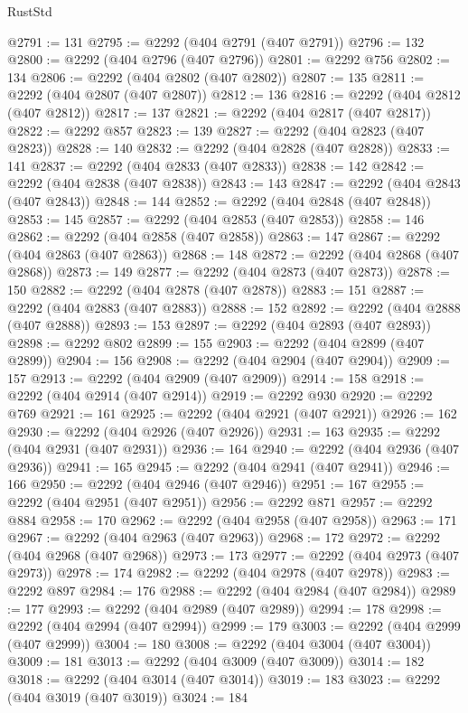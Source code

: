 \begin{lexlean}{RustStd}
\begin{coremodule}
@2791 := 131
@2795 := @2292 (@404 @2791 (@407 @2791))
@2796 := 132
@2800 := @2292 (@404 @2796 (@407 @2796))
@2801 := @2292 @756
@2802 := 134
@2806 := @2292 (@404 @2802 (@407 @2802))
@2807 := 135
@2811 := @2292 (@404 @2807 (@407 @2807))
@2812 := 136
@2816 := @2292 (@404 @2812 (@407 @2812))
@2817 := 137
@2821 := @2292 (@404 @2817 (@407 @2817))
@2822 := @2292 @857
@2823 := 139
@2827 := @2292 (@404 @2823 (@407 @2823))
@2828 := 140
@2832 := @2292 (@404 @2828 (@407 @2828))
@2833 := 141
@2837 := @2292 (@404 @2833 (@407 @2833))
@2838 := 142
@2842 := @2292 (@404 @2838 (@407 @2838))
@2843 := 143
@2847 := @2292 (@404 @2843 (@407 @2843))
@2848 := 144
@2852 := @2292 (@404 @2848 (@407 @2848))
@2853 := 145
@2857 := @2292 (@404 @2853 (@407 @2853))
@2858 := 146
@2862 := @2292 (@404 @2858 (@407 @2858))
@2863 := 147
@2867 := @2292 (@404 @2863 (@407 @2863))
@2868 := 148
@2872 := @2292 (@404 @2868 (@407 @2868))
@2873 := 149
@2877 := @2292 (@404 @2873 (@407 @2873))
@2878 := 150
@2882 := @2292 (@404 @2878 (@407 @2878))
@2883 := 151
@2887 := @2292 (@404 @2883 (@407 @2883))
@2888 := 152
@2892 := @2292 (@404 @2888 (@407 @2888))
@2893 := 153
@2897 := @2292 (@404 @2893 (@407 @2893))
@2898 := @2292 @802
@2899 := 155
@2903 := @2292 (@404 @2899 (@407 @2899))
@2904 := 156
@2908 := @2292 (@404 @2904 (@407 @2904))
@2909 := 157
@2913 := @2292 (@404 @2909 (@407 @2909))
@2914 := 158
@2918 := @2292 (@404 @2914 (@407 @2914))
@2919 := @2292 @930
@2920 := @2292 @769
@2921 := 161
@2925 := @2292 (@404 @2921 (@407 @2921))
@2926 := 162
@2930 := @2292 (@404 @2926 (@407 @2926))
@2931 := 163
@2935 := @2292 (@404 @2931 (@407 @2931))
@2936 := 164
@2940 := @2292 (@404 @2936 (@407 @2936))
@2941 := 165
@2945 := @2292 (@404 @2941 (@407 @2941))
@2946 := 166
@2950 := @2292 (@404 @2946 (@407 @2946))
@2951 := 167
@2955 := @2292 (@404 @2951 (@407 @2951))
@2956 := @2292 @871
@2957 := @2292 @884
@2958 := 170
@2962 := @2292 (@404 @2958 (@407 @2958))
@2963 := 171
@2967 := @2292 (@404 @2963 (@407 @2963))
@2968 := 172
@2972 := @2292 (@404 @2968 (@407 @2968))
@2973 := 173
@2977 := @2292 (@404 @2973 (@407 @2973))
@2978 := 174
@2982 := @2292 (@404 @2978 (@407 @2978))
@2983 := @2292 @897
@2984 := 176
@2988 := @2292 (@404 @2984 (@407 @2984))
@2989 := 177
@2993 := @2292 (@404 @2989 (@407 @2989))
@2994 := 178
@2998 := @2292 (@404 @2994 (@407 @2994))
@2999 := 179
@3003 := @2292 (@404 @2999 (@407 @2999))
@3004 := 180
@3008 := @2292 (@404 @3004 (@407 @3004))
@3009 := 181
@3013 := @2292 (@404 @3009 (@407 @3009))
@3014 := 182
@3018 := @2292 (@404 @3014 (@407 @3014))
@3019 := 183
@3023 := @2292 (@404 @3019 (@407 @3019))
@3024 := 184

\end{coremodule}
\end{lexlean}
